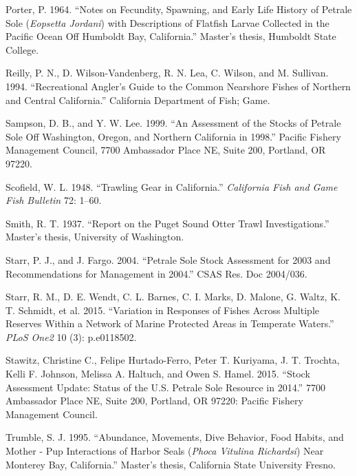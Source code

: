 \documentclass[11pt,
  english,
  letterpaper,
]{article}
\newlength{\cslhangindent}
\newenvironment{CSLReferences}[2] %
 {%
  \setlength{\parindent}{0pt}
  \ifodd #1 \everypar{\setlength{\hangindent}{\cslhangindent}}\ignorespaces\fi
  \ifnum #2 > 0
  \setlength{\parskip}{#2\baselineskip}
  \fi
 }%
 {}
\begin{document}
\begin{CSLReferences}{1}{0}
\leavevmode{}%
Porter, P. 1964. {``Notes on Fecundity, Spawning, and Early Life History of Petrale Sole (\emph{{Eopsetta} Jordani}) with Descriptions of Flatfish Larvae Collected in the {Pacific} {Ocean} Off {Humboldt} {Bay}, {California}.''} Master's thesis, Humboldt State College.

\leavevmode{}%
Reilly, P. N., D. Wilson-Vandenberg, R. N. Lea, C. Wilson, and M. Sullivan. 1994. {``Recreational Angler's Guide to the Common Nearshore Fishes of {Northern} and {Central} {California}.''} California Department of Fish; Game.

\leavevmode{}%
Sampson, D. B., and Y. W. Lee. 1999. {``An Assessment of the Stocks of Petrale Sole Off {Washington}, {Oregon}, and {Northern} {California} in 1998.''} Pacific Fishery Management Council, 7700 Ambassador Place NE, Suite 200, Portland, OR 97220.

\leavevmode{}%
Scofield, W. L. 1948. {``Trawling Gear in {California}.''} \emph{California Fish and Game Fish Bulletin} 72: 1--60.

\leavevmode{}%
Smith, R. T. 1937. {``Report on the {Puget} {Sound} Otter Trawl Investigations.''} Master's thesis, University of Washington.

\leavevmode{}%
Starr, P. J., and J. Fargo. 2004. {``Petrale Sole Stock Assessment for 2003 and Recommendations for Management in 2004.''} CSAS Res. Doc 2004/036.

\leavevmode{}%
Starr, R. M., D. E. Wendt, C. L. Barnes, C. I. Marks, D. Malone, G. Waltz, K. T. Schmidt, et al. 2015. {``Variation in Responses of Fishes Across Multiple Reserves Within a Network of Marine Protected Areas in Temperate Waters.''} \emph{PLoS One2} 10 (3): p.e0118502.

\leavevmode{}%
Stawitz, Christine C., Felipe Hurtado-Ferro, Peter T. Kuriyama, J. T. Trochta, Kelli F. Johnson, Melissa A. Haltuch, and Owen S. Hamel. 2015. {``Stock Assessment Update: {Status} of the {U}.{S}. Petrale Sole Resource in 2014.''} 7700 Ambassador Place NE, Suite 200, Portland, OR 97220: Pacific Fishery Management Council.

\leavevmode{}%
Trumble, S. J. 1995. {``Abundance, Movements, Dive Behavior, Food Habits, and Mother - Pup Interactions of Harbor Seals (\emph{{Phoca} Vitulina Richardsi}) Near {Monterey} {Bay}, {California}.''} Master's thesis, California State University Fresno.


\end{CSLReferences}
\end{document}
